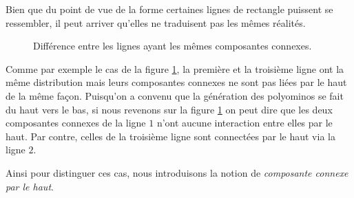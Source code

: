 Bien que du point de vue de la forme certaines lignes de rectangle puissent se ressembler, il peut arriver qu'elles ne traduisent pas les mêmes réalités.
\begin{figure}[!htb]
\begin{minipage}[c]{.16\linewidth}
        \centering
\end{minipage}
\hfill
\begin{minipage}[c]{.66\linewidth}
        \centering
\begin{logicpuzzle}[rows=5,columns=4,color=cyan!100, width=750px,scale=0.5]
\framepuzzle[black!50]
\end{logicpuzzle}
\end{minipage}
\caption{\label{Atfig4} Différence entre les lignes ayant les mêmes composantes connexes.}
\end{figure} 
Comme par exemple le cas de la figure \ref{Atfig4}, la première et la troisième ligne ont la même distribution  mais leurs composantes connexes ne sont pas liées par le haut de la même façon. Puisqu'on a convenu que la génération des polyominos se fait du haut vers le bas, si nous revenons sur la figure \ref{Atfig4} on peut  dire que les deux composantes connexes de la ligne $1$ n'ont aucune interaction entre elles par le haut. Par contre, celles de la troisième ligne sont connectées par le haut via la ligne $2$.

Ainsi pour distinguer ces cas, nous introduisons la notion de \emph{composante connexe par le haut}.


